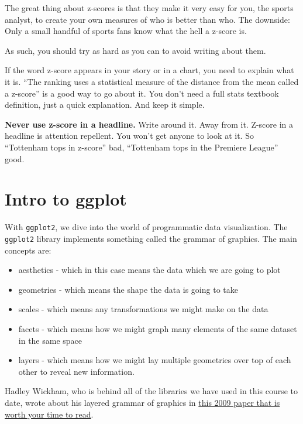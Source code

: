 \documentclass[
]{book}
\providecommand{\tightlist}{%
  \setlength{\itemsep}{0pt}\setlength{\parskip}{0pt}}
\begin{document}
The great thing about z-scores is that they make it very easy for you, the sports analyst, to create your own measures of who is better than who. The downside: Only a small handful of sports fans know what the hell a z-score is.

As such, you should try as hard as you can to avoid writing about them.

If the word z-score appears in your story or in a chart, you need to explain what it is. ``The ranking uses a statistical measure of the distance from the mean called a z-score'' is a good way to go about it. You don't need a full stats textbook definition, just a quick explanation. And keep it simple.

\textbf{Never use z-score in a headline.} Write around it. Away from it. Z-score in a headline is attention repellent. You won't get anyone to look at it. So ``Tottenham tops in z-score'' bad, ``Tottenham tops in the Premiere League'' good.

\hypertarget{intro-to-ggplot}{%
\chapter{Intro to ggplot}\label{intro-to-ggplot}}

With \texttt{ggplot2}, we dive into the world of programmatic data visualization. The \texttt{ggplot2} library implements something called the grammar of graphics. The main concepts are:

\begin{itemize}
\tightlist
\item
  aesthetics - which in this case means the data which we are going to plot
\item
  geometries - which means the shape the data is going to take
\item
  scales - which means any transformations we might make on the data
\item
  facets - which means how we might graph many elements of the same dataset in the same space
\item
  layers - which means how we might lay multiple geometries over top of each other to reveal new information.
\end{itemize}

Hadley Wickham, who is behind all of the libraries we have used in this course to date, wrote about his layered grammar of graphics in \href{http://byrneslab.net/classes/biol607/readings/wickham_layered-grammar.pdf}{this 2009 paper that is worth your time to read}.
\end{document}
